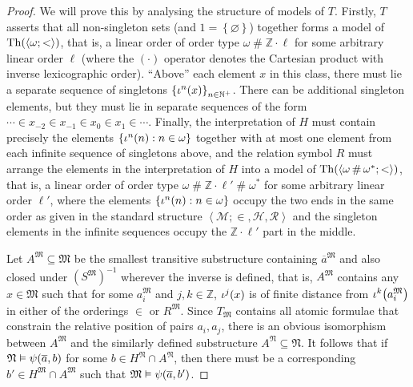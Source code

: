 \documentclass[11pt]{article}
\theoremstyle{plain}
\theoremstyle{definition}
\newcommand{\tuple}[1]{\left\langle #1 \right\rangle}
\DeclareMathOperator{\hash}{{\#}}
\DeclareMathOperator{\Th}{Th}
\begin{document}
\begin{proof}
  We will prove this by analysing the structure of models of $T$. Firstly, $T$ asserts that all non-singleton sets (and $1 = \left\{\varnothing\right\}$) together forms a model of $\Th\mleft(\tuple{\omega; <}\mright)$, that is, a linear order of order type $\omega \hash \mathbb{Z} \cdot \ell$ for some arbitrary linear order $\ell$ (where the $\left(\cdot\right)$ operator denotes the Cartesian product with inverse lexicographic order). ``Above'' each element $x$ in this class, there must lie a separate sequence of singletons $\left\{\iota^n\mleft(x\mright)\right\}_{n \in \mathbb{N}^+}$. There can be additional singleton elements, but they must lie in separate sequences of the form $\cdots \in x_{-2} \in x_{-1} \in x_0 \in x_1 \in \cdots$. Finally, the interpretation of $H$ must contain precisely the elements $\left\{\iota^n\mleft(n\mright) : n \in \omega\right\}$ together with at most one element from each infinite sequence of singletons above, and the relation symbol $R$ must arrange the elements in the interpretation of $H$ into a model of $\Th\mleft(\tuple{\omega \hash \omega^*; <}\mright)$, that is, a linear order of order type $\omega \hash \mathbb{Z} \cdot \ell' \hash \omega^*$ for some arbitrary linear order $\ell'$, where the elements $\left\{\iota^n\mleft(n\mright) : n \in \omega\right\}$ occupy the two ends in the same order as given in the standard structure $\tuple{\mathcal{M}; \in, \mathcal{H}, \mathcal{R}}$ and the singleton elements in the infinite sequences occupy the $\mathbb{Z} \cdot \ell'$ part in the middle.

  Let $A^\mathfrak{M} \subseteq \mathfrak{M}$ be the smallest transitive substructure containing $\overline{a}^\mathfrak{M}$ and also closed under $\left(S^\mathfrak{M}\right)^{-1}$ wherever the inverse is defined, that is, $A^\mathfrak{M}$ contains any $x \in \mathfrak{M}$ such that for some $a_i^\mathfrak{M}$ and $j, k \in \mathbb{Z}$, $\iota^j\mleft(x\mright)$ is of finite distance from $\iota^k\mleft(a_i^\mathfrak{M}\mright)$ in either of the orderings $\in$ or $R^\mathfrak{M}$. Since $T_\mathfrak{M}$ contains all atomic formulae that constrain the relative position of pairs $a_i, a_j$, there is an obvious isomorphism between $A^\mathfrak{M}$ and the similarly defined substructure $A^\mathfrak{N} \subseteq \mathfrak{N}$. It follows that if $\mathfrak{N} \vDash \psi\mleft(\overline{a}, b\mright)$ for some $b \in H^\mathfrak{N} \cap A^\mathfrak{N}$, then there must be a corresponding $b' \in H^\mathfrak{M} \cap A^\mathfrak{M}$ such that $\mathfrak{M} \vDash \psi\mleft(\overline{a}, b'\mright)$.


\end{proof}
\end{document}

